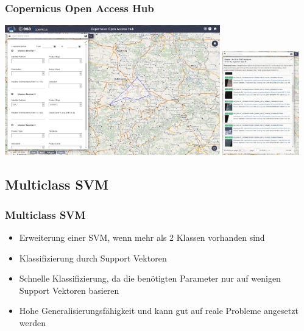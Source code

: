 \documentclass{beamer}
\begin{document}

\begin{frame}\frametitle{Copernicus Open Access Hub}
	\centering
	\includegraphics[width=0.7\textwidth,height=0.6\textheight]{pics/scihub-query.PNG}
	\hspace{.5em}
	\includegraphics[width=0.25\textwidth,height=0.6\textheight]{pics/scihub-productlist.PNG}
\end{frame}


\begin{frame}\section{Multiclass SVM}\frametitle{Multiclass SVM}
	\begin{itemize}
		\item Erweiterung einer SVM, wenn mehr als 2 Klassen vorhanden sind
		\item Klassifizierung durch Support Vektoren
		\item Schnelle Klassifizierung, da die benötigten Parameter nur auf wenigen Support Vektoren basieren
		\item Hohe Generalisierungsfähigkeit und kann gut auf reale Probleme angesetzt werden
	\end{itemize}
\end{frame}

\end{document}
